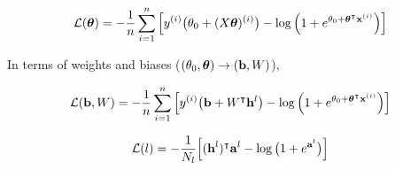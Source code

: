

\begin{equation}\label{eq:logistic_cost_function}
    \mathcal{L}(\boldsymbol{\theta}) = -  \frac{1}{n}\sum_{i=1}^n \Big[ y^{(i)} \big(\theta_0 + (X\boldsymbol{\theta})^{(i)}\big) - \log{\Big(1+e^{\theta_0 + \boldsymbol{\theta}^\intercal\mathbf{x}^{(i)}}\Big)} \Big]
\end{equation}

In terms of weights and biases ($ (\theta_0,  \boldsymbol{\theta} ) \to (\mathbf{b}, W)$),

\begin{equation}\label{eq:logistic_cost_function_NN}
    \mathcal{L}(\mathbf{b}, W) = -  \frac{1}{n}\sum_{i=1}^n \Big[ y^{(i)} \big(\mathbf{b} + W^\intercal \mathbf{h}^{l}\big) - \log{\Big(1+e^{\theta_0 + \boldsymbol{\theta}^\intercal\mathbf{x}^{(i)}}\Big)} \Big]
\end{equation}

\begin{equation}\label{eq:logistic_cost_function_NN2}
    \mathcal{L}(l) = -  \frac{1}{N_l} \Big[ (\mathbf{h}^{l})^\intercal\mathbf{a}^{l} - \log{\big(1+e^{\mathbf{a}^{l}}\big)} \Big]
\end{equation}
